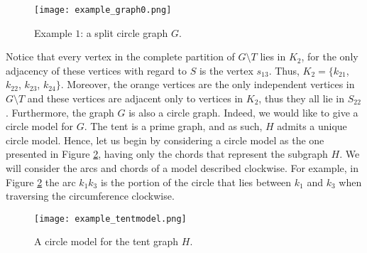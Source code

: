 \documentclass[12pt]{book}
\theoremstyle{plain}
\theoremstyle{remark}
\begin{document}
\begin{figure}[h!] 
	\centering
	\texttt{[image: example\_graph0.png]}
	\caption{Example $1$: a split circle graph $G$.}
		\label{fig:example_graph0}
\end{figure}


Notice that every vertex in the complete partition of $G \setminus T$ lies in $K_2$, for the only adjacency of these vertices with regard to $S$ is the vertex $s_{13}$. 
Thus, $K_2 = \{ k_{21}$, $k_{22}$, $k_{23}$, $k_{24}\}$. 
Moreover, the orange vertices are the only independent vertices in $G\setminus T$ and these vertices are adjacent only to vertices in $K_2$, thus they all lie in $S_{22}$.
Furthermore, the graph $G$ is also a circle graph. Indeed, we would like to give a circle model for $G$. 
The tent is a prime graph, and as such, $H$ admits a unique circle model. Hence, let us begin by considering a circle model as the one presented in Figure \ref{fig:example_tentmodel}, having only the chords that represent the subgraph $H$. 
We will consider the arcs and chords of a model described clockwise. For example, in Figure \ref{fig:example_tentmodel} the arc $k_1 k_3$ is the portion of the circle that lies between $k_1$ and $k_3$ when traversing the circumference clockwise.

\begin{figure}[h!] 
	\centering
	\texttt{[image: example\_tentmodel.png]}
	\caption{A circle model for the tent graph $H$.}
		\label{fig:example_tentmodel}
\end{figure}

\end{document}
